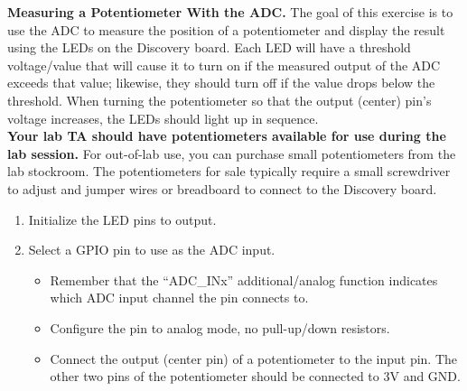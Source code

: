 \documentclass[openany,11pt,fleqn]{book} %
\begin{document}
\begin{exercise}
	\textbf{Measuring a Potentiometer With the ADC.}
	The goal of this exercise is to use the ADC to measure the position of a potentiometer and display the result using the LEDs on the Discovery board. Each LED will have a threshold voltage/value that will cause it to turn on if the measured output of the ADC exceeds that value; likewise, they should turn off if the value drops below the threshold. When turning the potentiometer so that the output (center) pin's voltage increases, the LEDs should light up in sequence. \\ 
	
	\textbf{Your lab TA should have potentiometers available for use during the lab session.} For out-of-lab use, you can purchase small potentiometers from the lab stockroom. The potentiometers for sale typically require a small screwdriver to adjust and jumper wires or breadboard to connect to the Discovery board. 
	
	\begin{enumerate} 
	    \item Initialize the LED pins to output.
	    \item Select a GPIO pin to use as the ADC input.
	    \begin{itemize}
	        \item Remember that the ``ADC\_INx'' additional/analog function indicates which ADC input channel the pin connects to.
	        \item Configure the pin to analog mode, no pull-up/down resistors.
	        \item Connect the output (center pin) of a potentiometer to the input pin. The other two pins of the potentiometer should be connected to 3V and GND.
	    \end{itemize} 
	    
	        
	

\end{enumerate}
\end{exercise}
\end{document}
